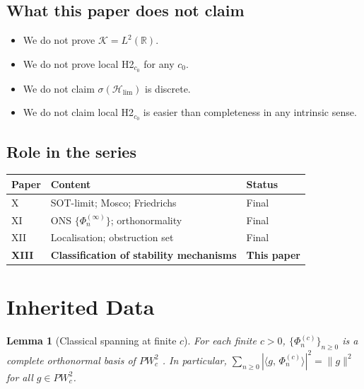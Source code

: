 \documentclass[12pt,a4paper]{amsart}
\newtheorem{lemma}[theorem]{Lemma}
\theoremstyle{definition}
\theoremstyle{remark}
\newcommand{\norm}[1]{\|#1\|}
\newcommand{\ip}[2]{\langle #1,\, #2\rangle}
\newcommand{\Hlim}{\mathcal{H}_{\lim}}
\newcommand{\Phiinf}[1]{\Phi_{#1}^{(\infty)}}
\newcommand{\Phic}[2]{\Phi_{#2}^{(#1)}}
\newcommand{\PW}{PW}
\newcommand{\spc}[1]{\sigma(#1)}
\newcommand{\Kspace}{\mathcal{K}}
\begin{document}
\subsection{What this paper does not claim}
\begin{itemize}
\item We do not prove $\Kspace = L^2(\mathbb{R})$.
\item We do not prove local H2$_{c_0}$ for any $c_0$.
\item We do not claim $\spc{\Hlim}$ is discrete.
\item We do not claim local H2$_{c_0}$ is easier than
  completeness in any intrinsic sense.
\end{itemize}

\subsection{Role in the series}
\begin{center}
\begin{tabular}{lll}
\toprule
Paper & Content & Status \\
\midrule
X  & SOT-limit; Mosco; Friedrichs & Final \\
XI & ONS $\{\Phiinf{n}\}$; orthonormality & Final \\
XII & Localisation; obstruction set & Final \\
\textbf{XIII} & \textbf{Classification of stability mechanisms}
    & \textbf{This paper} \\
\bottomrule
\end{tabular}
\end{center}

\section{Inherited Data}
\label{sec:input}

\begin{lemma}[Classical spanning at finite $c$]
\label{lem:finite-c-basis}
For each finite $c > 0$,
$\{\Phic{c}{n}\}_{n \ge 0}$ is a complete orthonormal
basis of $\PW_c^2$ \cite{Slepian1961,Osipov2013}.
In particular,
$\sum_{n \ge 0}|\ip{g}{\Phic{c}{n}}|^2 = \norm{g}^2$
for all $g \in \PW_c^2$.
\end{lemma}
\end{document}
